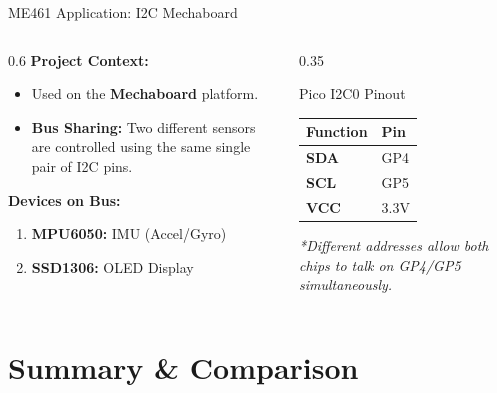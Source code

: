 \begin{frame}{ME461 Application: I2C Mechaboard}
\begin{columns}
    \begin{column}{0.6\textwidth}
        \textbf{Project Context:}
        \begin{itemize}
            \item Used on the \textbf{Mechaboard} platform.
            \item \textbf{Bus Sharing:} Two different sensors are controlled using the same single pair of I2C pins.
        \end{itemize}
        
        \vspace{0.2cm}
        \textbf{Devices on Bus:}
        \begin{enumerate}
            \item \textbf{MPU6050:} IMU (Accel/Gyro)
            \item \textbf{SSD1306:} OLED Display
        \end{enumerate}
    \end{column}
    
    \begin{column}{0.35\textwidth}
        \begin{block}{Pico I2C0 Pinout}
        \centering
        \begin{tabular}{ll}
        \toprule
        \textbf{Function} & \textbf{Pin} \\
        \midrule
        \textbf{SDA} & GP4 \\
        \textbf{SCL} & GP5 \\
        \textbf{VCC} & 3.3V \\
        \bottomrule
        \end{tabular}
        \end{block}
        
        \vspace{0.2cm}
        \footnotesize \textit{*Different addresses allow both chips to talk on GP4/GP5 simultaneously.}
    \end{column}
\end{columns}
\end{frame}




\section{Summary & Comparison}

